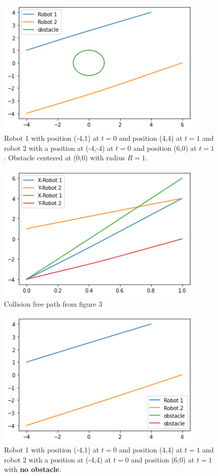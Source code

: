 \begin{figure}[H]
    \centering
    \includegraphics[width=10cm]{Graphs/Plot 2.png}
    \caption{Robot 1 with position (-4,1) at \( t = 0 \) and position (4,4) at \( t = 1 \) and robot 2 with a position at (-4,-4) at \( t = 0 \) and position (6,0) at \( t = 1 \). Obstacle centered at  (0,0) with radius \( R = 1 \).}
    \label{fig:my_label}
\end{figure}

\begin{figure}[H]
    \centering
    \includegraphics[width=10cm]{Graphs/Collision free path for plot 2.png}
    \caption{Collision free path from figure 3}
    \label{fig:my_label}
\end{figure}

\begin{figure}[H]
    \centering
    \includegraphics[width=10cm]{Graphs/Plot 3.png}
    \caption{Robot 1 with position (-4,1) at \( t = 0 \) and position (4,4) at \( t = 1 \) and robot 2 with a position at (-4,4) at \( t = 0 \) and position (6,0) at \( t = 1 \) with \textbf{no obstacle}.}
    \label{fig:my_label}
\end{figure}

